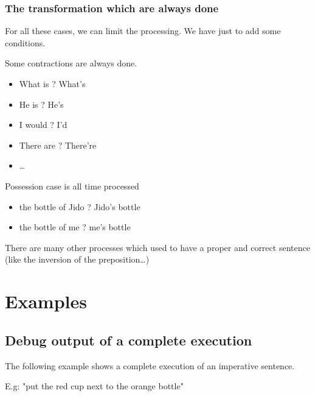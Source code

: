 \documentclass[twoside,a4paper,10pt]{report}
\begin{document}
\subsection{The transformation which are always done}
\label{bb9df422d8d164804928d2b3ad4898ec}%
For all these cases, we can limit the processing. We have just to add some conditions.

Some contractions are always done.


\begin{itemize}
    \item  What is ? What's
    \item  He is ? He's
    \item  I would ? I'd
    \item  There are ? There're
    \item  \ldots{}
\end{itemize}

Possession case is all time processed


\begin{itemize}
    \item  the bottle of Jido ? Jido's bottle
    \item  the bottle of me ? me's bottle
\end{itemize}

There are many other processes which used to have a proper and correct sentence (like the inversion of the preposition\ldots{}) 


\chapter{Examples}
\label{bfebe34154a0dfd9fc7b447fc9ed74e9}%

\section{Debug output of a complete execution}
\label{0097f2f6e11fc0ff7741d98d8bff8634}%

The following example shows a complete execution of an imperative sentence.

E.g: "put the red cup next to the orange bottle"
\end{document}
